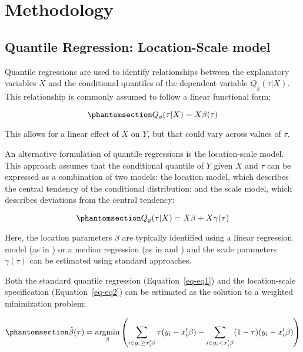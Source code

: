 \documentclass[
  12pt,
  oneside]{article}
\begin{document}
\section{Methodology}\label{sec-method}

\subsection{Quantile Regression: Location-Scale model}\label{sec-betas}

Quantile regressions are used to identify relationships between the
explanatory variables \(X\) and the conditional quantiles of the
dependent variable \(Q_y(\tau|X)\). This relationship is commonly
assumed to follow a linear functional form:

\begin{equation}\phantomsection\label{eq-eq1}{Q_y(\tau|X) =X\beta(\tau)
}\end{equation}

This allows for a linear effect of \(X\) on \(Y\), but that could vary
across values of \(\tau\).

An alternative formulation of quantile regressions is the location-scale
model. This approach assumes that the conditional quantile of \(Y\)
given \(X\) and \(\tau\) can be expressed as a combination of two
models: the location model, which describes the central tendency of the
conditional distribution; and the scale model, which describes
deviations from the central tendency:

\begin{equation}\phantomsection\label{eq-eq2}{Q_y(\tau|X) =X\beta+X\gamma(\tau)
}\end{equation}

Here, the location parameters \(\beta\) are typically identified using a
linear regression model (as in \citet{mss2019}) or a median regression
(as in \citet{he1997} and \citet{zhao2000}) and the scale parameters
\(\gamma(\tau)\) can be estimated using standard approaches.

Both the standard quantile regression (Equation~\ref{eq-eq1}) and the
location-scale specification (Equation~\ref{eq-eq2}) can be estimated as
the solution to a weighted minimization problem:

\begin{equation}\phantomsection\label{eq-eq3}{\hat{\beta}(\tau) = \underset{\beta}{\operatorname{argmin}}
\left( \sum_{i\in y_i\geq x_i'\beta} \tau (y_i - x_i'\beta) - \sum_{i\in y_i<x_i'\beta} (1-\tau)(y_i - x_i'\beta) \right)
}\end{equation}
\end{document}

